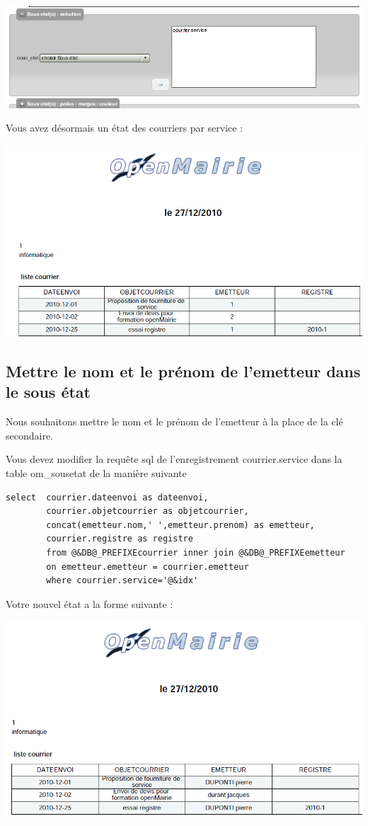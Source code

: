 \documentclass[letterpaper,10pt,french]{manual}
\begin{document}
\includegraphics{utilisation_14.png}

Vous avez désormais un état des courriers par service :

\includegraphics{utilisation_15.png}


\subsection{Mettre le nom et le prénom de l'emetteur dans le sous état}

Nous souhaitons mettre le nom et le prénom de l'emetteur à la place de
la clé secondaire.

Vous devez modifier la requête sql de l'enregistrement courrier.service
dans la table om\_sousetat de la manière suivante

\begin{Verbatim}[commandchars=@\[\]]
select  courrier.dateenvoi as dateenvoi,
        courrier.objetcourrier as objetcourrier,
        concat(emetteur.nom,' ',emetteur.prenom) as emetteur,
        courrier.registre as registre
        from @&DB@_PREFIXEcourrier inner join @&DB@_PREFIXEemetteur
        on emetteur.emetteur = courrier.emetteur
        where courrier.service='@&idx'
\end{Verbatim}

Votre nouvel état a la forme suivante :

\includegraphics{utilisation_16.png}
\end{document}
